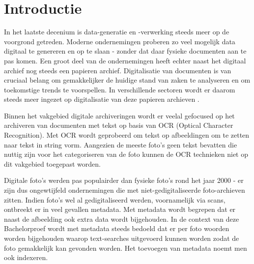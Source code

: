 
\section{Introductie} %
\label{sec:introductie}
In het laatste decenium is data-generatie en -verwerking steeds meer op de voorgrond getreden. Moderne ondernemingen proberen zo veel mogelijk data digitaal te genereren en op te slaan - zonder dat daar fysieke documenten aan te pas komen. Een groot deel van de ondernemingen heeft echter naast het digitaal archief nog steeds een papieren archief.
Digitalisatie van documenten is van cruciaal belang om gemakkelijker de huidige stand van zaken te analyseren en om toekomstige trends te voorspellen. In verschillende sectoren wordt er daarom steeds meer ingezet op digitalisatie van deze papieren archieven \autocite{PekkaLeviaekangas2020}. 

Binnen het vakgebied digitale archiveringen wordt er veelal gefocused op het archiveren van documenten met tekst op basis van OCR (Optical Character Recognition). Met OCR wordt geprobeerd om tekst op afbeeldingen om te zetten naar tekst in string vorm. Aangezien de meeste foto's geen tekst bevatten die nuttig zijn voor het categoriseren van de foto kunnen de OCR technieken niet op dit vakgebied toegepast worden.

Digitale foto's werden pas populairder dan fysieke foto's rond het jaar 2000 \autocite{HenryC.LucasJr.2009} - er zijn dus ongewtijfeld ondernemingen die met niet-gedigitaliseerde foto-archieven zitten. Indien foto's wel al gedigitaliseerd werden, voornamelijk via scans, ontbreekt er in veel gevallen metadata. Met metadata wordt begrepen dat er naast de afbeelding ook extra data wordt bijgehouden. In de context van deze Bachelorproef wordt met metadata steeds bedoeld dat er per foto woorden worden bijgehouden waarop text-searches uitgevoerd kunnen worden zodat de foto gemakkelijk kan gevonden worden. Het toevoegen van metadata noemt men ook indexeren.

